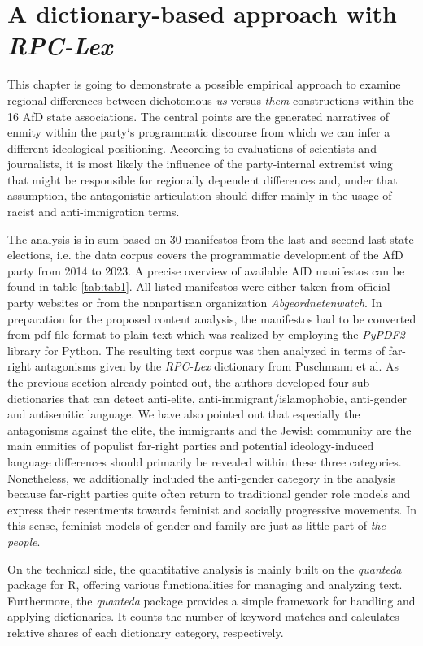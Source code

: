 \documentclass[a4paper]{scrreprt}
\begin{document}
\section{A dictionary-based approach with \em RPC-Lex}
This chapter is going to demonstrate a possible empirical approach to examine regional differences between dichotomous {\em us} versus {\em them} constructions within the 16 AfD state associations. The central points are the generated narratives of enmity within the party‘s programmatic discourse from which we can infer a different ideological positioning. According to evaluations of scientists and journalists, it is most likely the influence of the party-internal extremist wing that might be responsible for regionally dependent differences and, under that assumption, the antagonistic articulation should differ mainly in the usage of racist and anti-immigration terms.\par
The analysis is in sum based on 30 manifestos from the last and second last state elections, i.e. the data corpus covers the programmatic development of the AfD party from 2014 to 2023. A precise overview of available AfD manifestos can be found in table \ref{tab:tab1}. All listed manifestos were either taken from official party websites or from the nonpartisan organization {\em Abgeordnetenwatch}. In preparation for the proposed content analysis, the manifestos had to be converted from pdf file format to plain text which was realized by employing the {\em PyPDF2} library for Python. The resulting text corpus was then analyzed in terms of far-right antagonisms given by the {\em RPC-Lex} dictionary from Puschmann et al. As the previous section already pointed out, the authors developed four sub-dictionaries that can detect anti-elite, anti-immigrant/islamophobic, anti-gender and antisemitic language. We have also pointed out that especially the antagonisms against the elite, the immigrants and the Jewish community are the main enmities of populist far-right parties and potential ideology-induced language differences should primarily be revealed within these three categories. Nonetheless, we additionally included the anti-gender category in the analysis because far-right parties quite often return to traditional gender role models and express their resentments towards feminist and socially progressive movements. In this sense, feminist models of gender and family are just as little part of {\em the people}.\par
On the technical side, the quantitative analysis is mainly built on the {\em quanteda} package for R, offering various functionalities for managing and analyzing text. \citep{quanteda} Furthermore, the {\em quanteda} package provides a simple framework for handling and applying dictionaries. It counts the number of keyword matches and calculates relative shares of each dictionary category, respectively.
\end{document}
